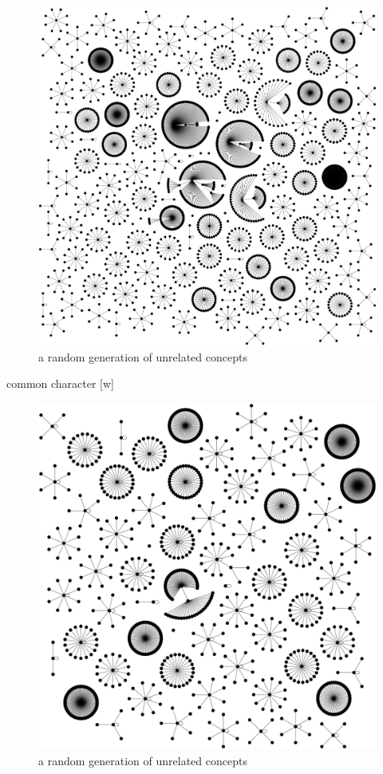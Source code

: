 \documentclass[11pt]{article}
\begin{document}
\begin{figure}[htp]
\includegraphics[scale=0.14]{img/m_directories.png}
\caption{a random generation of unrelated concepts}
\label{}
\end{figure}




common character [w]

\begin{figure}[htp]
\includegraphics[scale=0.20]{img/w_directories.png}
\caption{a random generation of unrelated concepts}
\label{}
\end{figure}
\end{document}
